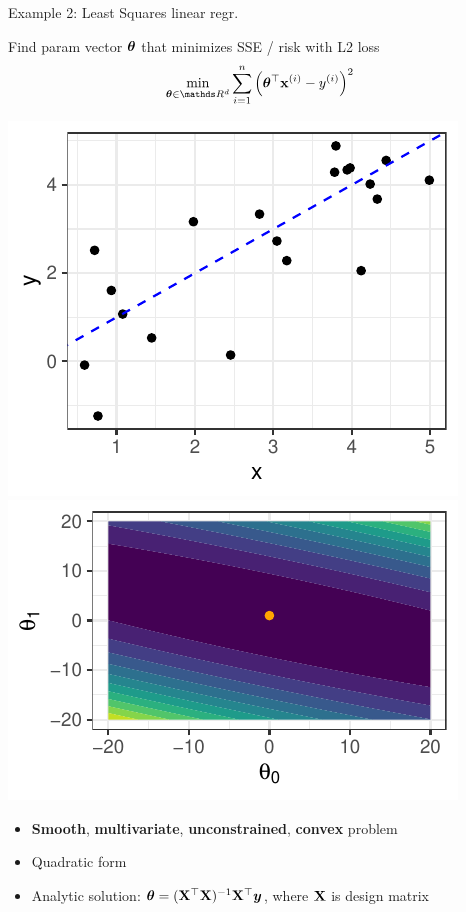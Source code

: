 \documentclass[11pt,compress,t,notes=noshow, xcolor=table]{beamer}
\begin{document}
\begin{vbframe}{Example 2: Least Squares linear regr.} 

Find param vector $\bm{\theta}$ that minimizes SSE / risk with L2 loss
$$
\min_{\thetab \in \R^d} \sumin \left(\thetab^\top \xi - \yi\right)^2
$$


\begin{center}
	\includegraphics[height=0.30\textwidth, keepaspectratio]{figure_man/ml_linreg_example_1.pdf} ~~ \includegraphics[height=0.30\textwidth, keepaspectratio]{figure_man/ml_linreg_example_2.pdf}
\end{center}

\begin{itemize}
	\item \textbf{Smooth}, \textbf{multivariate}, \textbf{unconstrained}, \textbf{convex} problem
	\item Quadratic form
	\item Analytic solution: $\bm{\theta} = (\mathbf{X}^\top \mathbf{X})^{-1}\mathbf{X}^\top \bm{y}$, where $\mathbf{X}$ is design matrix
\end{itemize}




\end{vbframe}
\end{document}

